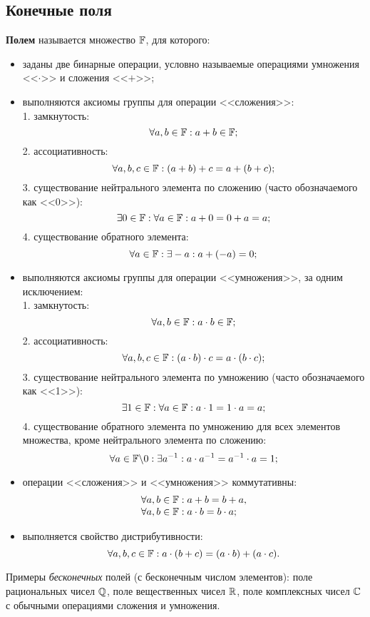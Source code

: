 \subsection{Конечные поля}\label{section-fields}

\textbf{Полем} называется множество $\mathbb{F}$, для которого:
\begin{itemize}
    \item заданы две бинарные операции, условно называемые операциями умножения <<$\cdot$>> и сложения <<$+$>>;
    \item выполняются аксиомы группы для операции <<сложения>>: \\
        1. замкнутость:
		\[\forall a, b \in \mathbb{F}: a + b \in \mathbb{F};\]
        2. ассоциативность:
		\[\forall a, b, c \in \mathbb{F}: (a+b)+c = a+(b+c);\]
        3. существование нейтрального элемента по сложению (часто обозначаемого как <<0>>):
		\[\exists 0 \in \mathbb{F}: \forall a \in \mathbb{F}: a + 0 = 0 + a = a; \]
        4. существование обратного элемента:
		\[\forall a \in \mathbb{F}: \exists -a: a + (-a) = 0; \]
    \item выполняются аксиомы группы для операции <<умножения>>, за одним исключением: \\
        1. замкнутость:
		\[\forall a, b \in \mathbb{F}: a \cdot b \in \mathbb{F}; \]
        2. ассоциативность:
		\[\forall a, b, c \in \mathbb{F}: (a \cdot b) \cdot c = a \cdot (b \cdot c);\]
        3. существование нейтрального элемента по умножению (часто обозначаемого как <<1>>):
		\[\exists 1 \in \mathbb{F}: \forall a \in \mathbb{F}: a \cdot 1 = 1 \cdot a = a;\]
        4. существование обратного элемента по умножению для всех элементов множества, кроме нейтрального элемента по сложению:
		\[\forall a \in {\mathbb{F}\backslash 0}: \exists a^{-1}: a \cdot a^{-1} = a^{-1} \cdot a = 1;\]
    \item операции <<сложения>> и <<умножения>> коммутативны: \\
        \[ \begin{array}{l}
            \forall a, b \in \mathbb{F}: a + b = b + a, \\
            \forall a, b \in \mathbb{F}: a \cdot b = b \cdot a; \\
        \end{array} \]
    \item выполняется свойство дистрибутивности:
        \[ \forall a, b, c \in \mathbb{F}: a \cdot (b + c) = (a \cdot b) + (a \cdot c). \]
\end{itemize}

Примеры \emph{бесконечных} полей (с бесконечным числом элементов): поле рациональных чисел $\mathbb{Q}$, поле вещественных чисел $\mathbb{R}$, поле комплексных чисел $\mathbb{C}$ с обычными операциями сложения и умножения.

